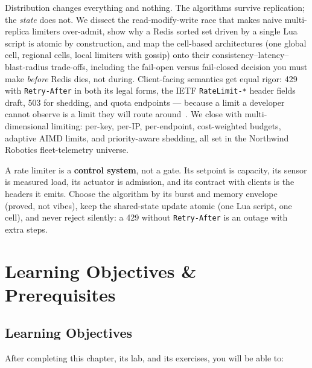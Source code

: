 Distribution changes everything and nothing. The algorithms survive
replication; the \emph{state} does not. We dissect the read-modify-write
race that makes naive multi-replica limiters over-admit, show why a Redis
sorted set driven by a single Lua script is atomic by construction, and map
the cell-based architectures (one global cell, regional cells, local
limiters with gossip) onto their consistency--latency--blast-radius
trade-offs, including the fail-open versus fail-closed decision you must
make \emph{before} Redis dies, not during. Client-facing semantics get equal
rigor: 429 with \texttt{Retry-After} in both its legal forms, the IETF
\texttt{RateLimit-*} header fields draft, 503 for shedding, and quota
endpoints --- because a limit a developer cannot observe is a limit they
will route around~\cite{ietf_ratelimit_headers,rfc9110}. We close with
multi-dimensional limiting: per-key, per-IP, per-endpoint, cost-weighted
budgets, adaptive AIMD limits, and priority-aware shedding, all set in the
Northwind Robotics fleet-telemetry universe.

\begin{keyconceptbox}
A rate limiter is a \textbf{control system}, not a gate. Its setpoint is
capacity, its sensor is measured load, its actuator is admission, and its
contract with clients is the headers it emits. Choose the algorithm by its
burst and memory envelope (proved, not vibes), keep the shared-state update
atomic (one Lua script, one cell), and never reject silently: a 429 without
\texttt{Retry-After} is an outage with extra steps.
\end{keyconceptbox}

\section{Learning Objectives \& Prerequisites}
\label{sec:ch14-objectives}

\subsection*{Learning Objectives}
After completing this chapter, its lab, and its exercises, you will be able
to:

